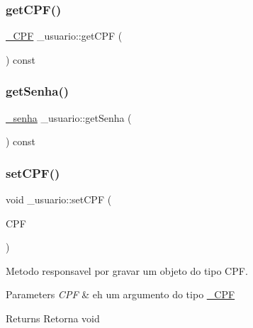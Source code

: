 \subsubsection{\texorpdfstring{getCPF()}{getCPF()}}
{\footnotesize\ttfamily \mbox{\hyperlink{class___c_p_f}{\+\_\+\+C\+PF}} \+\_\+usuario\+::get\+C\+PF (\begin{DoxyParamCaption}{ }\end{DoxyParamCaption}) const}

\mbox{\label{class__usuario_aceba317161568d5598db05138720407e}} 
\subsubsection{\texorpdfstring{getSenha()}{getSenha()}}
{\footnotesize\ttfamily \mbox{\hyperlink{class__senha}{\+\_\+senha}} \+\_\+usuario\+::get\+Senha (\begin{DoxyParamCaption}{ }\end{DoxyParamCaption}) const}

\mbox{\label{class__usuario_aae9711f941cbcb4e981a5ceb88d55a1c}} 
\subsubsection{\texorpdfstring{setCPF()}{setCPF()}}
{\footnotesize\ttfamily void \+\_\+usuario\+::set\+C\+PF (\begin{DoxyParamCaption}\item[{const \mbox{\hyperlink{class___c_p_f}{\+\_\+\+C\+PF}} \&}]{C\+PF }\end{DoxyParamCaption})}



Metodo responsavel por gravar um objeto do tipo C\+PF. 


\begin{DoxyParams}{Parameters}
{\em C\+PF} & eh um argumento do tipo \mbox{\hyperlink{class___c_p_f}{\+\_\+\+C\+PF}} \\
\hline
\end{DoxyParams}
\begin{DoxyReturn}{Returns}
Retorna void 
\end{DoxyReturn}
\mbox{\label{class__usuario_a9ed3a34f39c7176a58279b66dc41bce9}} 
